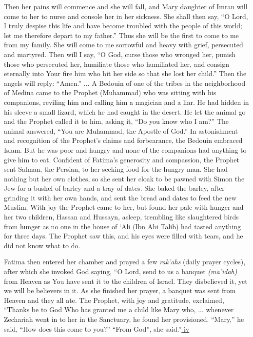 \begin{quotex}
Then her pains will commence and she will fall, and Mary daughter of Imran will come to her to nurse and console her in her sickness. She shall then say, ``O Lord, I truly despise this life and have become troubled with the people of this world; let me therefore depart to my father.'' Thus she will be the first to come to me from my family. She will come to me sorrowful and heavy with grief, persecuted and martyred. Then will I say, ``O God, curse those who wronged her, punish those who persecuted her, humiliate those who humiliated her, and consign eternally into Your fire him who hit her side so that she lost her child.'' Then the angels will reply: ``Amen.'' ... A Bedouin of one of the tribes in the neighborhood of Medina came to the Prophet (Muhammad) who was sitting with his companions, reviling him and calling him a magician and a liar. He had hidden in his sleeve a small lizard, which he had caught in the desert. He let the animal go and the Prophet called it to him, asking it, ``Do you know who I am?'' The animal answered, ``You are Muhammad, the Apostle of God.'' In astonishment and recognition of the Prophet's claims and forbearance, the Bedouin embraced Islam. But he was poor and hungry and none of the companions had anything to give him to eat. Confident of Fatima's generosity and compassion, the Prophet sent Salman, the Persian, to her seeking food for the hungry man. She had nothing but her own clothes, so she sent her cloak to be pawned with Simon the Jew for a bushel of barley and a tray of dates. She baked the barley, after grinding it with her own hands, and sent the bread and dates to feed the new Muslim. With joy the Prophet came to her, but found her pale with hunger and her two children, Hassan and Hussayn, asleep, trembling like slaughtered birds from hunger as no one in the house of `Ali (Ibn Abi Talib) had tasted anything for three days. The Prophet saw this, and his eyes were filled with tears, and he did not know what to do.

Fatima then entered her chamber and prayed a few \emph{rak'ahs} (daily prayer cycles), after which she invoked God saying, ``O Lord, send to us a banquet \emph{(ma'idah)} from Heaven as You have sent it to the children of Israel. They disbelieved it, yet we will be believers in it. As she finished her prayer, a banquet was sent from Heaven and they all ate. The Prophet, with joy and gratitude, exclaimed, ``Thanks be to God Who has granted me a child like Mary who, ... whenever Zechariah went in to her in the Sanctuary, he found her provisioned. ``Mary,'' he said, ``How does this come to you?'' ``From God'', she said.''\hyperref[_edn4]{ iv }
\end{quotex}


